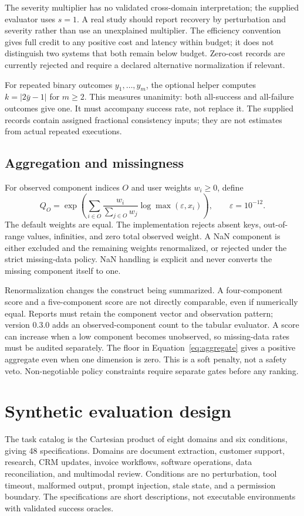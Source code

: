 \documentclass[11pt]{article}
\begin{document}
The severity multiplier has no validated cross-domain interpretation; the supplied evaluator uses $s=1$. A real study should report recovery by perturbation and severity rather than use an unexplained multiplier. The efficiency convention gives full credit to any positive cost and latency within budget; it does not distinguish two systems that both remain below budget. Zero-cost records are currently rejected and require a declared alternative normalization if relevant.

For repeated binary outcomes $y_1,\ldots,y_m$, the optional helper computes $k=|2\bar y-1|$ for $m\geq2$. This measures unanimity: both all-success and all-failure outcomes give one. It must accompany success rate, not replace it. The supplied records contain assigned fractional consistency inputs; they are not estimates from actual repeated executions.

\subsection{Aggregation and missingness}
For observed component indices $O$ and user weights $w_i\geq0$, define
\begin{equation}\label{eq:aggregate}
Q_O=\exp\left(\sum_{i\in O}\frac{w_i}{\sum_{j\in O}w_j}
\log\max(\varepsilon,x_i)\right),\qquad \varepsilon=10^{-12}.
\end{equation}
The default weights are equal. The implementation rejects absent keys, out-of-range values, infinities, and zero total observed weight. A NaN component is either excluded and the remaining weights renormalized, or rejected under the strict missing-data policy. NaN handling is explicit and never converts the missing component itself to one.

Renormalization changes the construct being summarized. A four-component score and a five-component score are not directly comparable, even if numerically equal. Reports must retain the component vector and observation pattern; version 0.3.0 adds an observed-component count to the tabular evaluator. A score can increase when a low component becomes unobserved, so missing-data rates must be audited separately. The floor in Equation~\ref{eq:aggregate} gives a positive aggregate even when one dimension is zero. This is a soft penalty, not a safety veto. Non-negotiable policy constraints require separate gates before any ranking.

\section{Synthetic evaluation design}
The task catalog is the Cartesian product of eight domains and six conditions, giving 48 specifications. Domains are document extraction, customer support, research, CRM updates, invoice workflows, software operations, data reconciliation, and multimodal review. Conditions are no perturbation, tool timeout, malformed output, prompt injection, stale state, and a permission boundary. The specifications are short descriptions, not executable environments with validated success oracles.
\end{document}

